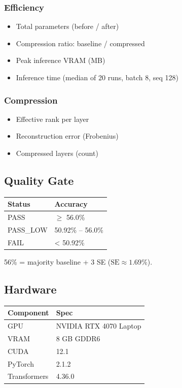 \subsubsection{Efficiency}

\begin{itemize}
\item Total parameters (before / after)
\item Compression ratio: baseline / compressed
\item Peak inference VRAM (MB)
\item Inference time (median of 20 runs, batch 8, seq 128)

\end{itemize}
\subsubsection{Compression}

\begin{itemize}
\item Effective rank per layer
\item Reconstruction error (Frobenius)
\item Compressed layers (count)

\end{itemize}
\subsection{Quality Gate}

\begin{table}[H]
\centering
\small
\begin{tabular}{ll}
\toprule
\textbf{Status} & \textbf{Accuracy} \\
\midrule
PASS & $\ge$ 56.0\% \\
PASS\_LOW & 50.92\% -- 56.0\% \\
FAIL & \textless{} 50.92\% \\
\bottomrule
\end{tabular}
\end{table}

56\% = majority baseline + 3 SE ($\text{SE} \approx 1.69\%$).

\subsection{Hardware}

\begin{table}[H]
\centering
\small
\begin{tabular}{ll}
\toprule
\textbf{Component} & \textbf{Spec} \\
\midrule
GPU & NVIDIA RTX 4070 Laptop \\
VRAM & 8 GB GDDR6 \\
CUDA & 12.1 \\
PyTorch & 2.1.2 \\
Transformers & 4.36.0 \\
\bottomrule
\end{tabular}
\end{table}

